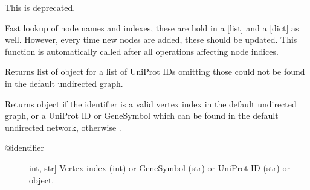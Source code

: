 \documentclass[letterpaper,10pt,english]{sphinxmanual}
\begin{document}
\begin{fulllineitems}

\begin{fulllineitems}
\label{\detokenize{main:pypath.main.PyPath.update_vindex}}
This is deprecated.

\end{fulllineitems}


\begin{fulllineitems}
\label{\detokenize{main:pypath.main.PyPath.update_vname}}
Fast lookup of node names and indexes, these are hold in a
{[}list{]} and a {[}dict{]} as well. However, every time new nodes are
added, these should be updated. This function is automatically
called after all operations affecting node indices.

\end{fulllineitems}


\begin{fulllineitems}
\label{\detokenize{main:pypath.main.PyPath.ups}}
Returns list of  object
for a list of UniProt IDs omitting those
could not be found in the default
undirected graph.

\end{fulllineitems}


\begin{fulllineitems}
\label{\detokenize{main:pypath.main.PyPath.v}}
Returns  object if the identifier
is a valid vertex index in the default undirected graph,
or a UniProt ID or GeneSymbol which can be found in the
default undirected network, otherwise .
\begin{description}
\item[{@identifier}] \leavevmode{[}int, str{]}
Vertex index (int) or GeneSymbol (str) or UniProt ID (str) or
 object.

\end{description}


\end{fulllineitems}
\end{fulllineitems}
\end{document}
